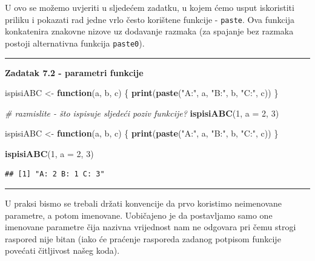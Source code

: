 \documentclass[]{book}
\newenvironment{Shaded}{\begin{snugshade}}{\end{snugshade}}
\newcommand{\KeywordTok}[1]{\textcolor[rgb]{0.13,0.29,0.53}{\textbf{#1}}}
\newcommand{\DataTypeTok}[1]{\textcolor[rgb]{0.13,0.29,0.53}{#1}}
\newcommand{\DecValTok}[1]{\textcolor[rgb]{0.00,0.00,0.81}{#1}}
\newcommand{\StringTok}[1]{\textcolor[rgb]{0.31,0.60,0.02}{#1}}
\newcommand{\CommentTok}[1]{\textcolor[rgb]{0.56,0.35,0.01}{\textit{#1}}}
\newcommand{\ControlFlowTok}[1]{\textcolor[rgb]{0.13,0.29,0.53}{\textbf{#1}}}
\newcommand{\NormalTok}[1]{#1}
\theoremstyle{definition}
\theoremstyle{definition}
\theoremstyle{definition}
\theoremstyle{remark}
\begin{document}
U ovo se možemo uvjeriti u sljedećem zadatku, u kojem ćemo usput
iskoristiti priliku i pokazati rad jedne vrlo često korištene funkcije -
\texttt{paste}. Ova funkcija konkatenira znakovne nizove uz dodavanje
razmaka (za spajanje bez razmaka postoji alternativna funkcija
\texttt{paste0}).

\begin{center}\rule{0.5\linewidth}{\linethickness}\end{center}

\textbf{Zadatak 7.2 - parametri funkcije}

\begin{Shaded}
\begin{Highlighting}[]
\NormalTok{ispisiABC <-}\StringTok{ }\ControlFlowTok{function}\NormalTok{(a, b, c) \{}
   \KeywordTok{print}\NormalTok{(}\KeywordTok{paste}\NormalTok{(}\StringTok{"A:"}\NormalTok{, a, }\StringTok{"B:"}\NormalTok{, b, }\StringTok{"C:"}\NormalTok{, c))   }
\NormalTok{\}}

\CommentTok{# razmislite - što ispisuje sljedeći poziv funkcije? }
\KeywordTok{ispisiABC}\NormalTok{(}\DecValTok{1}\NormalTok{, }\DataTypeTok{a =} \DecValTok{2}\NormalTok{, }\DecValTok{3}\NormalTok{)}
\end{Highlighting}
\end{Shaded}

\begin{Shaded}
\begin{Highlighting}[]
\NormalTok{ispisiABC <-}\StringTok{ }\ControlFlowTok{function}\NormalTok{(a, b, c) \{}
   \KeywordTok{print}\NormalTok{(}\KeywordTok{paste}\NormalTok{(}\StringTok{"A:"}\NormalTok{, a, }\StringTok{"B:"}\NormalTok{, b, }\StringTok{"C:"}\NormalTok{, c))   }
\NormalTok{\}}

\KeywordTok{ispisiABC}\NormalTok{(}\DecValTok{1}\NormalTok{, }\DataTypeTok{a =} \DecValTok{2}\NormalTok{, }\DecValTok{3}\NormalTok{)}
\end{Highlighting}
\end{Shaded}

\begin{verbatim}
## [1] "A: 2 B: 1 C: 3"
\end{verbatim}

\begin{center}\rule{0.5\linewidth}{\linethickness}\end{center}

U praksi bismo se trebali držati konvencije da prvo koristimo
neimenovane parametre, a potom imenovane. Uobičajeno je da postavljamo
samo one imenovane parametre čija nazivna vrijednost nam ne odgovara pri
čemu strogi raspored nije bitan (iako će praćenje rasporeda zadanog
potpisom funkcije povećati čitljivost našeg koda).
\end{document}
